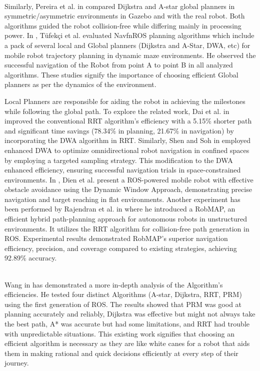 \documentclass[sigconf]{acmart}
\begin{document}
\\
Similarly, Pereira et al. in \cite {b5} compared Dijkstra and A-star global planners in symmetric/asymmetric environments in Gazebo and with the real robot. Both algorithms guided the robot collision-free while differing mainly in processing power. In \cite {b6}, Tüfekçi et al. evaluated NavfnROS planning algorithms which include a pack of several local and Global planners (Dijkstra and A-Star, DWA, etc) for mobile robot trajectory planning in dynamic maze environments. He observed the successful navigation of the Robot from point A to point B in all analyzed algorithms. These studies signify the importance of choosing efficient Global planners as per the dynamics of the environment.

Local Planners are responsible for aiding the robot in achieving the milestones while following the global path. To explore the related work, Dai et al. in \cite{b7} improved the conventional RRT algorithm's efficiency with a 5.15\% shorter path and significant time savings (78.34\% in planning, 21.67\% in navigation) by incorporating the DWA algorithm in RRT. Similarly, Shen and Soh in \cite{b8} employed enhanced DWA to optimize omnidirectional robot navigation in confined spaces by employing a targeted sampling strategy. This modification to the DWA enhanced efficiency, ensuring successful navigation trials in space-constrained environments. In \cite{b9}, Dien et al. present a ROS-powered mobile robot with effective obstacle avoidance using the Dynamic Window Approach, demonstrating precise navigation and target reaching in flat environments. Another experiment has been performed by Rajendran et al. in \cite{b10} where he introduced a RobMAP, an efficient hybrid path-planning approach for autonomous robots in unstructured environments. It utilizes the RRT algorithm for collision-free path generation in ROS. Experimental results demonstrated RobMAP's superior navigation efficiency, precision, and coverage compared to existing strategies, achieving 92.89\% accuracy. 

\\
Wang in \cite{b11} has demonstrated a more in-depth analysis of the Algorithm's efficiencies. He tested four distinct Algorithms (A-star, Dijkstra, RRT, PRM) using the first generation of ROS. The results showed that PRM was good at planning accurately and reliably, Dijkstra was effective but might not always take the best path, A* was accurate but had some limitations, and RRT had trouble with unpredictable situations. This existing work signifies that choosing an efficient algorithm is necessary as they are like white canes for a robot that aids them in making rational and quick decisions efficiently at every step of their journey. 
\end{document}
